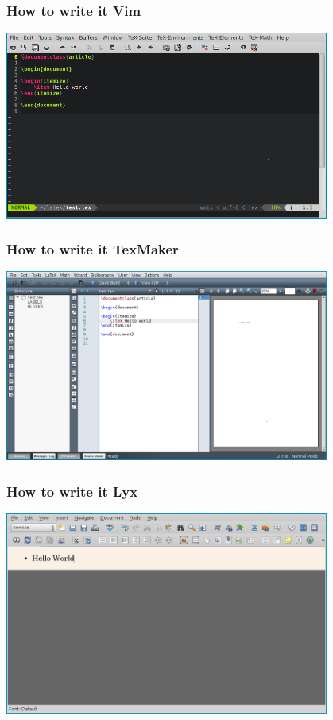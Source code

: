 \documentclass{beamer}
\begin{document}
\begin{frame}
    \frametitle{How to write it \textendash{} Vim}
    \begin{center}
        \includegraphics[width=0.8\textwidth]{img/vim.png}
    \end{center}
\end{frame}

\begin{frame}
    \frametitle{How to write it \textendash{} TexMaker}
    \begin{center}
        \includegraphics[width=0.8\textwidth]{img/texmaker.png}
    \end{center}
\end{frame}

\begin{frame}
    \frametitle{How to write it \textendash{} Lyx}
    \begin{center}
        \includegraphics[width=0.8\textwidth]{img/lyx.png}
    \end{center}
\end{frame}
\end{document}
